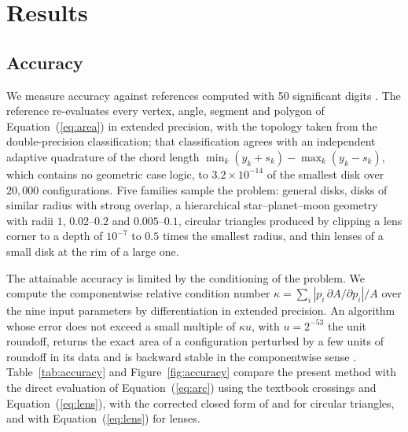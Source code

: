 \documentclass[twocolumn]{aastex701}
\begin{document}
\section{Results} \label{sec:results}

\subsection{Accuracy} \label{sec:accuracy}

We measure accuracy against references computed with 50 significant
digits \citep{mpmath}. The reference re-evaluates every vertex, angle,
segment and polygon of Equation~(\ref{eq:area}) in extended precision,
with the topology taken from the double-precision classification; that
classification agrees with an independent adaptive quadrature of the
chord length $\min_k(y_k+s_k)-\max_k(y_k-s_k)$, which contains no
geometric case logic, to $3.2\times10^{-14}$ of the smallest disk over
$20{,}000$ configurations. Five families sample the problem: general
disks, disks of similar radius with strong overlap, a hierarchical
star--planet--moon geometry with radii $1$, $0.02$--$0.2$ and
$0.005$--$0.1$, circular triangles produced by clipping a lens corner to
a depth of $10^{-7}$ to $0.5$ times the smallest radius, and thin lenses
of a small disk at the rim of a large one.

The attainable accuracy is limited by the conditioning of the problem. We
compute the componentwise relative condition number
$\kappa=\sum_i|p_i\,\partial A/\partial p_i|/A$ over the nine input
parameters by differentiation in extended precision. An algorithm whose
error does not exceed a small multiple of $\kappa u$, with
$u=2^{-53}$ the unit roundoff, returns the exact area of a configuration
perturbed by a few units of roundoff in its data and is backward stable
in the componentwise sense \citep{Higham2002}. Table~\ref{tab:accuracy}
and Figure~\ref{fig:accuracy} compare the present method with the direct
evaluation of Equation~(\ref{eq:arc}) using the textbook crossings and
Equation~(\ref{eq:lens}), with the corrected closed form of
\citet{Fewell2006} and \citet{GordonAgol2022} for circular triangles, and
with Equation~(\ref{eq:lens}) for lenses.
\end{document}
